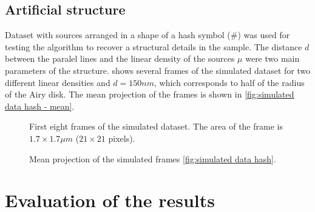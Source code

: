 \subsection{Artificial structure\label{sub:Simul hash}}
Dataset with sources arranged in a shape of a hash symbol (\#) was used for testing the algorithm to recover a structural details in the sample. The distance $d$ between the paralel lines and the linear density of the sources $\mu$ were two main parameters of the structure.  shows several frames of the simulated dataset for two different linear densities and $d=150\unit{nm}$, which corresponds to half of the radius of the Airy disk. The mean projection of the frames is shown in \autoref{fig:simulated data hash - mean}.
%
\begin{figure}[!htb]	
	\newcommand{\widthfig}{1\textwidth}
	\centering	
	
	
	\caption{First eight frames of the simulated dataset. The area of the frame is $1.7\times1.7\unit{\mu m}$ ($21\times21$ pixels).}
	\label{fig:simulated data hash}
\end{figure} 
%
\begin{figure}[!htb]	
	\newcommand{\widthfig}{.4\textwidth}
	\centering	
	\hspace{.3cm}	
	\caption{Mean projection of the simulated frames \autoref{fig:simulated data hash}.}
	\label{fig:simulated data hash - mean}
\end{figure} 


\clearpage
\section{Evaluation of the results\label{sec:evaluation}}

